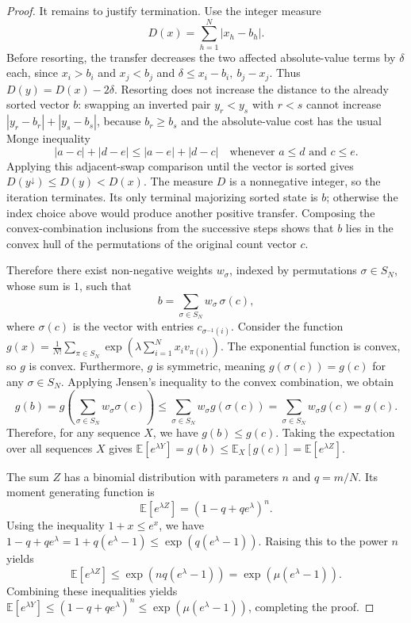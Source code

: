 \begin{proof}
It remains to justify termination.  Use the integer measure
\[
D(x)=\sum_{h=1}^N |x_h-b_h|.
\]
Before resorting, the transfer decreases the two affected absolute-value
terms by \(\delta\) each, since \(x_i>b_i\) and \(x_j<b_j\) and
\(\delta\le x_i-b_i,\ b_j-x_j\).  Thus \(D(y)=D(x)-2\delta\).  Resorting
does not increase the distance to the already sorted vector \(b\): swapping
an inverted pair \(y_r<y_s\) with \(r<s\) cannot increase
\(|y_r-b_r|+|y_s-b_s|\), because \(b_r\ge b_s\) and the absolute-value cost
has the usual Monge inequality
\[
|a-c|+|d-e|\le |a-e|+|d-c|
\quad\text{whenever }a\le d\text{ and }c\le e .
\]
Applying this adjacent-swap comparison until the vector is sorted gives
\(D(y^\downarrow)\le D(y)<D(x)\).  The measure \(D\) is a nonnegative
integer, so the iteration terminates.  Its only terminal majorizing sorted
state is \(b\); otherwise the index choice above would produce another
positive transfer.  Composing the convex-combination inclusions from the
successive steps shows that \(b\) lies in the convex hull of the permutations
of the original count vector \(c\).

Therefore there exist non-negative weights \(w_\sigma\), indexed by
permutations \(\sigma\in S_N\), whose sum is \(1\), such that
\[
b=\sum_{\sigma\in S_N}w_\sigma\,\sigma(c),
\]
where \(\sigma(c)\) is the vector with entries \(c_{\sigma^{-1}(i)}\).
Consider the function $g(x) = \frac{1}{N!} \sum_{\pi \in S_N} \exp(\lambda \sum_{i=1}^N x_i v_{\pi(i)})$. The exponential function is convex, so $g$ is convex. Furthermore, $g$ is symmetric, meaning $g(\sigma(c)) = g(c)$ for any $\sigma \in S_N$.
Applying Jensen's inequality to the convex combination, we obtain
\[
g(b) = g\left(\sum_{\sigma \in S_N} w_\sigma \sigma(c)\right) \le \sum_{\sigma \in S_N} w_\sigma g(\sigma(c)) = \sum_{\sigma \in S_N} w_\sigma g(c) = g(c).
\]
Therefore, for any sequence $X$, we have $g(b) \le g(c)$. Taking the expectation over all sequences $X$ gives $\mathbb{E}[e^{\lambda Y}] = g(b) \le \mathbb{E}_X[g(c)] = \mathbb{E}[e^{\lambda Z}]$.

The sum $Z$ has a binomial distribution with parameters $n$ and $q = m/N$. Its moment generating function is
\[
\mathbb{E}[e^{\lambda Z}] = (1 - q + q e^\lambda)^n.
\]
Using the inequality $1 + x \le e^x$, we have $1 - q + q e^\lambda = 1 + q(e^\lambda - 1) \le \exp(q(e^\lambda - 1))$. Raising this to the power $n$ yields
\[
\mathbb{E}[e^{\lambda Z}] \le \exp(nq(e^\lambda - 1)) = \exp(\mu(e^\lambda - 1)).
\]
Combining these inequalities yields $\mathbb{E}[e^{\lambda Y}] \le (1 - q + q e^\lambda)^n \le \exp(\mu(e^\lambda - 1))$, completing the proof.
\end{proof}
